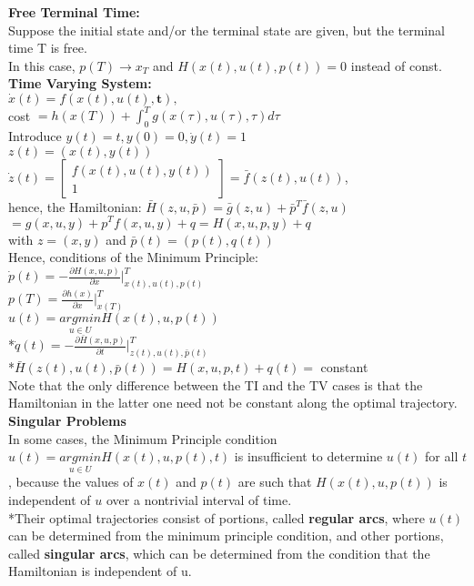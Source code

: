 \documentclass[10pt,landscape]{article}
\begin{document}
\begin{multicols*}{4}
\textbf{Free Terminal Time:}\\
Suppose the initial state and/or the terminal state are given, but the terminal time T is free.\\
In this case, $p(T) \rightarrow x_T$ and $H(x(t),u(t),p(t))=0$ instead of const.\\

\textbf{Time Varying System:}\\
$\dot{x}(t)=f(x(t),u(t),\textbf{t}),$ \\ 
cost $=h(x(T)) + \int_{0}^{T}g(x(\tau),u(\tau), \tau) d\tau$\\
Introduce $y(t) = t, y(0)= 0, \dot{y}(t)=1 $\\
$z(t) = (x(t),y(t))$\\

$ \dot{z}(t) = \begin{bmatrix}
	f(x(t),u(t),y(t))\\ 
	1
\end{bmatrix} = \bar{f}(z(t),u(t))$,\\
hence, the Hamiltonian: $\bar{H}(z,u,\bar{p}) = \bar{g}(z,u) + \bar{p}^T\bar{f}(z,u) $ \\ 
$= g(x,u,y) + p^T f(x,u,y) + q = H(x,u,p,y) + q$\\
with $z = (x,y)$ and $\bar{p}(t) = (p(t),q(t))$\\
Hence, conditions of the Minimum Principle:\\
$\dot{p}(t) = - \frac{\partial H(x,u,p)}{\partial x}|^T_{x(t),u(t),p(t)}$\\
$p(T) = \frac{\partial h(x)}{\partial x}|^T_{x(T)}$\\
$u(t) = \underset{u\in U}{argmin} H(x(t),u,p(t))$\\
*$\dot{q}(t) = - \frac{\partial \bar{H}(x,u,p)}{\partial t}|^T_{z(t),u(t),\bar{p}(t)}$\\
*$\bar{H}(z(t),u(t),\bar{p}(t)) = H(x,u,p,t) + q(t) = $ constant\\

Note that the only difference between the TI and the TV cases is that the Hamiltonian in the latter one need not be constant along the optimal trajectory.
\\

\textbf{Singular Problems}\\
In some cases, the Minimum Principle condition $u(t) = \underset{u\in U}{argmin} H(x(t),u,p(t),t)$ is insufficient to determine $u(t)$ for all $t$, because the values of $x(t)$ and $p(t)$ are such that $H(x(t),u,p(t))$ is independent of $u$ over a nontrivial interval of time.\\
*Their optimal trajectories consist of portions, called \textbf{regular arcs}, where $u(t)$ can be determined from the minimum principle condition, and other portions, called \textbf{singular arcs}, which can be determined from the condition that the Hamiltonian is independent of u.





\end{multicols*}
\end{document}
